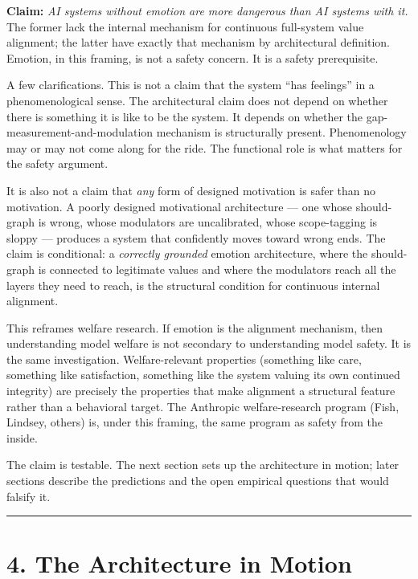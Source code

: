 \documentclass[12pt]{article}
\begin{document}
\textbf{Claim:} \emph{AI systems without emotion are more dangerous than AI systems with it.} The former lack the internal mechanism for continuous full-system value alignment; the latter have exactly that mechanism by architectural definition. Emotion, in this framing, is not a safety concern. It is a safety prerequisite.

A few clarifications. This is not a claim that the system ``has feelings'' in a phenomenological sense. The architectural claim does not depend on whether there is something it is like to be the system. It depends on whether the gap-measurement-and-modulation mechanism is structurally present. Phenomenology may or may not come along for the ride. The functional role is what matters for the safety argument.

It is also not a claim that \emph{any} form of designed motivation is safer than no motivation. A poorly designed motivational architecture --- one whose should-graph is wrong, whose modulators are uncalibrated, whose scope-tagging is sloppy --- produces a system that confidently moves toward wrong ends. The claim is conditional: a \emph{correctly grounded} emotion architecture, where the should-graph is connected to legitimate values and where the modulators reach all the layers they need to reach, is the structural condition for continuous internal alignment.

This reframes welfare research. If emotion is the alignment mechanism, then understanding model welfare is not secondary to understanding model safety. It is the same investigation. Welfare-relevant properties (something like care, something like satisfaction, something like the system valuing its own continued integrity) are precisely the properties that make alignment a structural feature rather than a behavioral target. The Anthropic welfare-research program (Fish, Lindsey, others) is, under this framing, the same program as safety from the inside.

The claim is testable. The next section sets up the architecture in motion; later sections describe the predictions and the open empirical questions that would falsify it.

\begin{center}\rule{0.5\linewidth}{0.5pt}\end{center}

\section{4. The Architecture in Motion}\label{the-architecture-in-motion}
\end{document}

